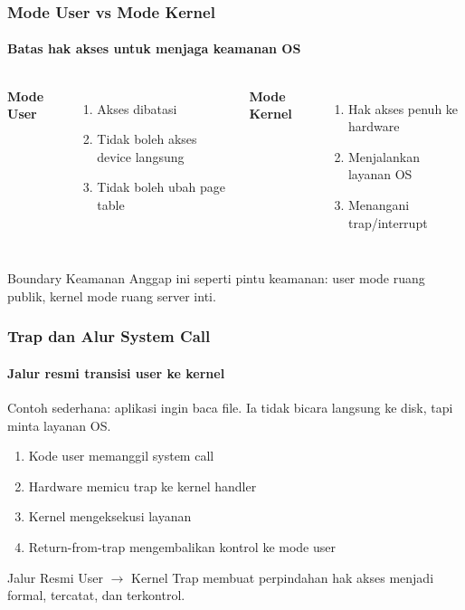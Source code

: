 \documentclass[t,aspectratio=169,xcolor=dvipsnames]{beamer}
\begin{document}
\begin{frame}
    \frametitle{Mode User vs Mode Kernel}
    \framesubtitle{Batas hak akses untuk menjaga keamanan OS}
    \small
    \begin{columns}[T]
        \textbf{Mode User}
        \begin{enumerate}
            \item Akses dibatasi
            \item Tidak boleh akses device langsung
            \item Tidak boleh ubah page table
        \end{enumerate}
        \textbf{Mode Kernel}
        \begin{enumerate}
            \item Hak akses penuh ke hardware
            \item Menjalankan layanan OS
            \item Menangani trap/interrupt
        \end{enumerate}
    \end{columns}
    \begin{alertblock}{Boundary Keamanan}
        Anggap ini seperti pintu keamanan: user mode ruang publik, kernel mode ruang server inti.
    \end{alertblock}
\end{frame}

\begin{frame}
    \frametitle{Trap dan Alur System Call}
    \framesubtitle{Jalur resmi transisi user ke kernel}
    \small
    Contoh sederhana: aplikasi ingin baca file. Ia tidak bicara langsung ke disk, tapi minta layanan OS.
    \begin{enumerate}
        \item Kode user memanggil system call
        \item Hardware memicu trap ke kernel handler
        \item Kernel mengeksekusi layanan
        \item Return-from-trap mengembalikan kontrol ke mode user
    \end{enumerate}
    \begin{block}{Jalur Resmi User $\rightarrow$ Kernel}
        Trap membuat perpindahan hak akses menjadi formal, tercatat, dan terkontrol.
    \end{block}
\end{frame}
\end{document}
